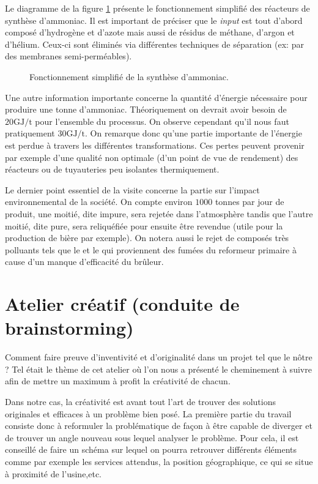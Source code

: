 Le diagramme de la figure \ref{fig:synthese} présente le fonctionnement simplifié 
des réacteurs de synthèse d'ammoniac. Il est important de préciser que le \emph{input}
est tout d'abord composé d'hydrogène et d'azote mais aussi de résidus de méthane, 
d'argon et d'hélium. Ceux-ci sont éliminés via différentes techniques 
de séparation (ex: par des membranes semi-perméables). 

\begin{figure}[h!]
	\begin{center}
		
	\end{center}
	\caption{Fonctionnement simplifié de la synthèse d'ammoniac.}
	\label{fig:synthese}
\end{figure}

Une autre information importante concerne la quantité d'énergie nécessaire pour produire
une tonne d'ammoniac. Théoriquement on devrait avoir besoin de $20 \si{\giga\joule/\tonne}$
pour l'ensemble du processus. On observe cependant qu'il nous faut 
pratiquement $30 \si{\giga\joule/\tonne}$. On remarque donc qu'une partie 
importante de l'énergie est perdue à travers les différentes transformations. 
Ces pertes peuvent provenir par exemple d'une qualité non optimale (d'un point de vue 
de rendement) des réacteurs ou de tuyauteries peu isolantes thermiquement.

Le dernier point essentiel de la visite concerne la partie sur l'impact environnemental 
de la société. On compte environ $1000$ tonnes par jour de  produit, une moitié,
dite impure, sera rejetée dans l'atmosphère tandis que l'autre moitié, dite pure, 
sera reliquéfiée pour ensuite être revendue (utile pour la production de bière par exemple).
On notera aussi le rejet de composés très polluants tels que le  et le  
qui proviennent des fumées du reformeur primaire à cause d'un manque d'efficacité
du brûleur.

\section{Atelier créatif (conduite de brainstorming)}

Comment faire preuve d'inventivité et d'originalité dans un projet tel que le nôtre ?
Tel était le thème de cet atelier où l'on nous a présenté le cheminement 
à suivre afin de mettre un maximum à profit la créativité de chacun.

Dans notre cas, la créativité est avant tout l'art de trouver des solutions 
originales et efficaces à un problème bien posé. 
La première partie du travail consiste donc à reformuler la problématique de façon 
à être capable de diverger et de trouver un angle nouveau sous lequel analyser le problème. 
Pour cela, il est conseillé de faire un schéma sur lequel on pourra retrouver différents
éléments comme par exemple les services attendus, la position géographique, 
ce qui se situe à proximité de l’usine,etc.

